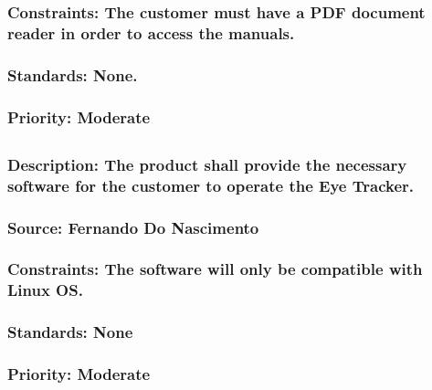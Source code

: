\subsubsection{Constraints: The customer must have a PDF document reader in order to access the manuals.}
\subsubsection{Standards: None.}
\subsubsection{Priority: Moderate}

\subsection{\bfSoftware}
\subsubsection{Description: The product shall provide the necessary software for the customer to operate the Eye Tracker.}
\subsubsection{Source: Fernando Do Nascimento}
\subsubsection{Constraints: The software will only be compatible with Linux OS.}
\subsubsection{Standards: None}
\subsubsection{Priority: Moderate}
